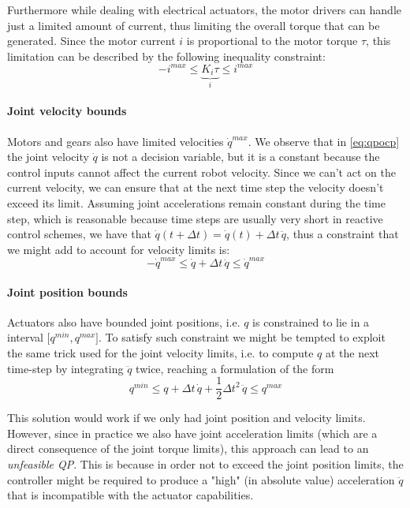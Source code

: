	Furthermore while dealing with electrical actuators, the motor drivers can handle just a limited amount of current, thus limiting the overall torque that can be generated.
	Since the motor current $i$ is proportional to the motor torque $\tau$, this limitation can be described by the following inequality constraint:
	\[ -i^{max} \leq \underbrace{K_i \tau}_{i} \leq i^{max} \]
	
	\paragraph{Joint velocity bounds} Motors and gears also have limited velocities $\dot q^{max}$. We observe that in \eqref{eq:qpocp} the joint velocity $\dot q$ is not a decision variable, but it is a constant because the control inputs cannot affect the current robot velocity. 
	Since we can't act on the current velocity, we can ensure that at the next time step the velocity doesn't exceed its limit. 
	Assuming joint accelerations remain constant during the time step, which is reasonable because time steps are usually very short in reactive control schemes, we have that $\dot q(t + \Delta t) = \dot q(t) + \Delta t \, \ddot q$, thus a constraint that we might add to account for velocity limits is:
	\[ -\dot q^{max} \leq \dot q + \Delta t \, \ddot q \leq \dot q^{max} \]
	
	\paragraph{Joint position bounds} Actuators also have bounded joint positions, i.e. $q $ is constrained to lie in a interval $\big[q^{min}, q^{max}\big]$. 
	To satisfy such constraint we might be tempted to exploit the same trick used for the joint velocity limits, i.e. to compute $q$ at the next time-step by integrating $\ddot q$ twice, reaching a formulation of the form
	\[ q^{min} \leq q + \Delta t\, \dot q + \frac 1 2 \Delta t^2 \, \ddot q \leq q^{max} \tag{$\circ$}\]
	
	This solution would work if we only had joint position and velocity limits. 
	However, since in practice we also have joint acceleration limits (which are a direct consequence of the joint torque limits), this approach can lead to an \textit{unfeasible QP}.
	This is because in order not to exceed the joint position limits, the controller might be required to produce a "high" (in absolute value) acceleration $\ddot q$ that is incompatible with the actuator capabilities.
	
